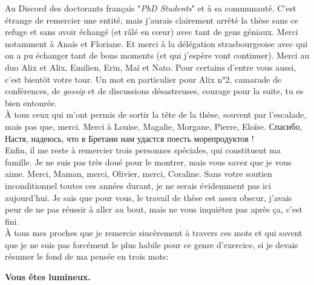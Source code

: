 Au Discord des doctorants français "\textit{PhD Students}" et à sa communauté. C'est étrange de remercier une entité, mais j'aurais clairement arrêté la thèse sans ce refuge et sans avoir échangé (et râlé en cœur) avec tant de gens géniaux. Merci notamment à Anaïs et Floriane. Et merci à la délégation strasbourgeoise avec qui on a pu échanger tant de bons moments (et qui j'espère vont continuer). Merci au duo Alix et Alix, Emilien, Erin, Maï et Nato. Pour certains d'entre vous aussi, c'est bientôt votre tour. Un mot en particulier pour Alix n°2, camarade de conférences, de \textit{gossip} et de discussions désastreuses, courage pour la suite, tu es bien entourée. \\

À tous ceux qui m'ont permis de sortir la tête de la thèse, souvent par l'escalade, mais pas que, merci. Merci à Louise, Magalie, Morgane, Pierre, Eloïse. \selectfont Спасибо, Настя, надеюсь, что в Бретани нам удастся поесть морепродуктов !\selectfont \\

Enfin, il me reste à remercier trois personnes spéciales, qui constituent ma famille. Je ne suis pas très doué pour le montrer, mais vous savez que je vous aime. Merci, Maman, merci, Olivier, merci, Coraline. Sans votre soutien inconditionnel toutes ces années durant, je ne serais évidemment pas ici aujourd'hui. Je sais que pour vous, le travail de thèse est assez obscur, j'avais peur de ne pas réussir à aller au bout, mais ne vous inquiétez pas après ça, c'est fini. \\

À tous mes proches que je remercie sincèrement à travers ces mots et qui savent que je ne suis pas forcément le plus habile pour ce genre d'exercice, si je devais résumer le fond de ma pensée en trois mots: \\
\begin{center}
\Large \textbf{Vous êtes lumineux.}
\end{center}
